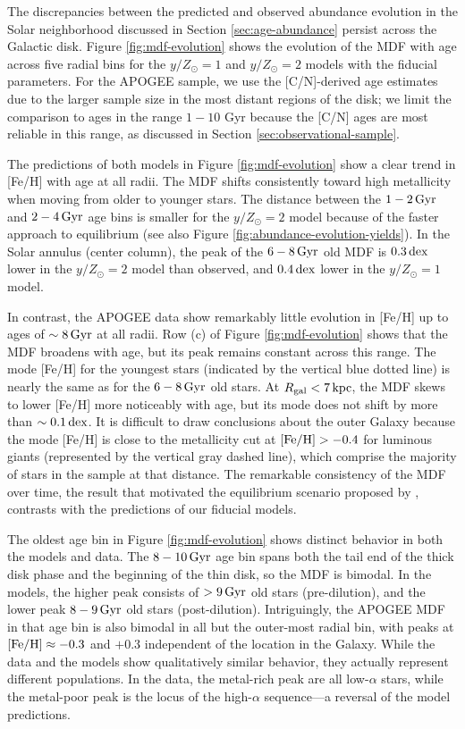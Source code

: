 \documentclass[twocolumn,twocolappendix,linenumbers]{aastex631}
\newcommand{\mathFeH}{{\rm [Fe/H]}}
\newcommand{\yZ}[1]{$y/Z_\odot=#1$}
\newcommand{\kpc}{\,{\rm kpc}}
\newcommand{\Gyr}{\,{\rm Gyr}}
\newcommand{\dex}{\,{\rm dex}}
\begin{document}
The discrepancies between the predicted and observed abundance evolution in the Solar neighborhood discussed in Section \ref{sec:age-abundance} persist across the Galactic disk. Figure \ref{fig:mdf-evolution} shows the evolution of the MDF with age across five radial bins for the \yZ{1} and \yZ{2} models with the fiducial parameters. For the APOGEE sample, we use the [C/N]-derived age estimates due to the larger sample size in the most distant regions of the disk; we limit the comparison to ages in the range $1-10$ Gyr because the [C/N] ages are most reliable in this range, as discussed in Section \ref{sec:observational-sample}. 

The predictions of both models in Figure \ref{fig:mdf-evolution} show a clear trend in [Fe/H] with age at all radii. The MDF shifts consistently toward high metallicity when moving from older to younger stars. The distance between the $1-2\Gyr$ and $2-4\Gyr$ age bins is smaller for the \yZ{2} model because of the faster approach to equilibrium (see also Figure \ref{fig:abundance-evolution-yields}). In the Solar annulus (center column), the peak of the $6-8\Gyr$ old MDF is $0.3\dex$ lower in the \yZ{2} model than observed, and $0.4\dex$ lower in the \yZ{1} model.

In contrast, the APOGEE data show remarkably little evolution in [Fe/H] up to ages of $\sim8\Gyr$ at all radii. Row (c) of Figure \ref{fig:mdf-evolution} shows that the MDF broadens with age, but its peak remains constant across this range. The mode [Fe/H] for the youngest stars (indicated by the vertical blue dotted line) is nearly the same as for the $6-8\Gyr$ old stars. At $R_{\rm gal}<7\kpc$, the MDF skews to lower [Fe/H] more noticeably with age, but its mode does not shift by more than $\sim0.1\dex$. It is difficult to draw conclusions about the outer Galaxy because the mode [Fe/H] is close to the metallicity cut at $\mathFeH>-0.4$ for luminous giants (represented by the vertical gray dashed line), which comprise the majority of stars in the sample at that distance. The remarkable consistency of the MDF over time, the result that motivated the equilibrium scenario proposed by \citet{johnson_milky_2024}, contrasts with the predictions of our fiducial models.

The oldest age bin in Figure \ref{fig:mdf-evolution} shows distinct behavior in both the models and data. The $8-10\Gyr$ age bin spans both the tail end of the thick disk phase and the beginning of the thin disk, so the MDF is bimodal. In the models, the higher peak consists of $>9\Gyr$ old stars (pre-dilution), and the lower peak $8-9\Gyr$ old stars (post-dilution). Intriguingly, the APOGEE MDF in that age bin is also bimodal in all but the outer-most radial bin, with peaks at $\mathFeH\approx-0.3$ and $+0.3$ independent of the location in the Galaxy. While the data and the models show qualitatively similar behavior, they actually represent different populations. In the data, the metal-rich peak are all low-$\alpha$ stars, while the metal-poor peak is the locus of the high-$\alpha$ sequence---a reversal of the model predictions.
\end{document}
